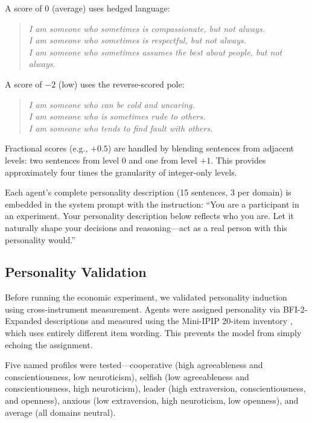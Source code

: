 \documentclass[12pt, a4paper]{article}
\begin{document}
A score of $0$ (average) uses hedged language:

\begin{quote}
\emph{I am someone who sometimes is compassionate, but not always.} \\
\emph{I am someone who sometimes is respectful, but not always.} \\
\emph{I am someone who sometimes assumes the best about people, but not always.}
\end{quote}

A score of $-2$ (low) uses the reverse-scored pole:

\begin{quote}
\emph{I am someone who can be cold and uncaring.} \\
\emph{I am someone who is sometimes rude to others.} \\
\emph{I am someone who tends to find fault with others.}
\end{quote}

Fractional scores (e.g., $+0.5$) are handled by blending sentences from adjacent levels: two sentences from level 0 and one from level $+1$. This provides approximately four times the granularity of integer-only levels.

Each agent's complete personality description (15 sentences, 3 per domain) is embedded in the system prompt with the instruction: ``You are a participant in an experiment. Your personality description below reflects who you are. Let it naturally shape your decisions and reasoning---act as a real person with this personality would.''

\subsection{Personality Validation}

Before running the economic experiment, we validated personality induction using cross-instrument measurement. Agents were assigned personality via BFI-2-Expanded descriptions and measured using the Mini-IPIP 20-item inventory \citep{donnellan2006mini}, which uses entirely different item wording. This prevents the model from simply echoing the assignment.

Five named profiles were tested---cooperative (high agreeableness and conscientiousness, low neuroticism), selfish (low agreeableness and conscientiousness, high neuroticism), leader (high extraversion, conscientiousness, and openness), anxious (low extraversion, high neuroticism, low openness), and average (all domains neutral).
\end{document}
